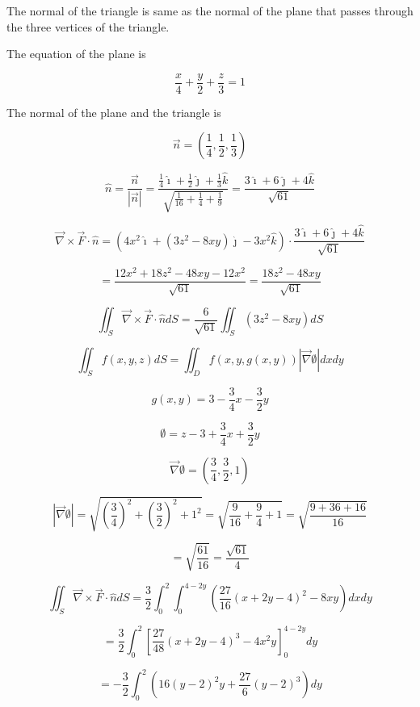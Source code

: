 \documentclass[12pt]{article}
\begin{document}
The normal of the triangle is same as the normal of the plane that passes through the three vertices of the triangle.

The equation of the plane is

\[
    \frac{x}{4} + \frac{y}{2} + \frac{z}{3} = 1
\]

The normal of the plane and the triangle is

\[
    \vec{n} = \left( \frac{1}{4}, \frac{1}{2}, \frac{1}{3} \right)
\]

\[
    \hat{n} = \frac{\vec{n}}{\left| \vec{n} \right|}
    = \frac{\frac{1}{4} \hat{\imath} + \frac{1}{2} \hat{\jmath} + \frac{1}{3} \hat{k}}{\sqrt{\frac{1}{16} + \frac{1}{4} + \frac{1}{9}}}
    = \frac{3 \hat{\imath} + 6 \hat{\jmath} + 4 \hat{k}}{\sqrt{61}}
\]

\[
    \vec{\nabla} \times \vec{F} \cdot \hat{n}
    = \left(
    4 x^2 \hat{\imath}
    + \left(3 z^2 - 8 x y\right) \hat{\jmath}
    - 3 x^2 \hat{k}
    \right) \cdot
    \frac{3 \hat{\imath} + 6 \hat{\jmath} + 4 \hat{k}}{\sqrt{61}}
\]

\[
    = \frac{12 x^2 + 18 z^2 - 48 x y - 12 x^2}{\sqrt{61}}
    = \frac{18 z^2 - 48 x y}{\sqrt{61}}
\]

\[
    \iint_S \vec{\nabla} \times \vec{F} \cdot \hat{n} d S
    = \frac{6}{\sqrt{61}} \iint_S \left(3 z^2 - 8 x y\right)  d S
\]

\[
    \iint_S f(x, y, z) d S= \iint_D f(x, y, g(x, y))|\vec{\nabla} \emptyset| d x d y
\]

\[
    g(x, y) = 3 - \frac{3}{4} x - \frac{3}{2} y
\]

\[
    \emptyset = z - 3 + \frac{3}{4} x + \frac{3}{2} y
\]

\[
    \vec{\nabla} \emptyset = \left( \frac{3}{4}, \frac{3}{2}, 1 \right)
\]

\[
    |\vec{\nabla} \emptyset| = \sqrt{{\left( \frac{3}{4} \right)}^2 + {\left( \frac{3}{2} \right)}^2 + 1^2}
    = \sqrt{\frac{9}{16} + \frac{9}{4} + 1}
    = \sqrt{\frac{9 + 36 + 16}{16}}
\]

\[
    = \sqrt{\frac{61}{16}}
    = \frac{\sqrt{61}}{4}
\]

\[
    \iint_S \vec{\nabla} \times \vec{F} \cdot \hat{n} d S
    = \frac{3}{2} \int_0^2 \int_0^{4-2y} \left(\frac{27}{16} {\left(x + 2y - 4\right)}^2 - 8 x y\right)  dx dy
\]


\[
    = \frac{3}{2} \int_0^2 {\left[\frac{27}{48} {\left(x + 2y - 4\right)}^3 - 4 x^2 y\right]}_0^{4-2y} dy
\]

\[
    = - \frac{3}{2} \int_0^2 {\left(16 {\left(y-2\right)}^2 y + \frac{27}{6} {\left(y - 2\right)}^3\right) } dy
\]
\end{document}
